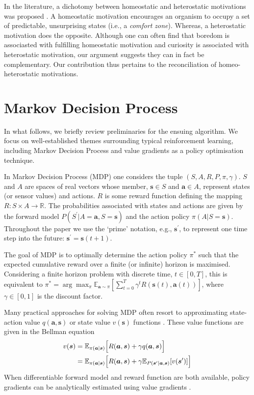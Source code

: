 \documentclass[utf8]{frontiersSCNS}
\newcommand{\bs}{\boldsymbol}
\newcommand{\argmax}{\arg\max}
\begin{document}
In the literature, a dichotomy between homeostatic and heterostatic motivations was proposed \citep{intrinsicmotiv}. A homeostatic motivation encourages an organism to occupy a set of predictable, unsurprising states (i.e., a {\it comfort zone}). Whereas, a heterostatic motivation does the opposite. Although one can often find that boredom is associasted with fulfilling homeostatic motivation and curiosity is associated with heterostatic motivation, our argument suggests they can in fact be complementary. Our contribution thus pertains to the reconciliation of homeo-heterostatic motivations.


\section{Markov Decision Process}

In what follows, we briefly review preliminaries for the ensuing algorithm. We focus on well-established themes surrounding typical reinforcement learning, including Markov Decision Process and value gradients as a policy optimisation technique. 

In Markov Decision Process (MDP) one considers the tuple $(S, A, R, P, \pi, \gamma)$. $S$ and $A$ are spaces of real vectors whose member, $\bs{s} \in S$ and $\bs{a} \in A$, represent states (or sensor values) and actions. $R$ is some reward function defining the mapping $R: S \times A \to \mathbb{R}$. The probabilities associated with states and actions are given by the forward model $P (S^\prime|A=\bs{a}, S=\bs{s})$ and the action policy $\pi(A|S=\bs{s})$. Throughout the paper we use the `prime' notation, e.g., $\bs{s}^\prime$, to represent one time step into the future: $\bs{s}^\prime=\bs{s}(t+1)$.

The goal of MDP is to optimally determine the action policy $\pi^\ast$ such that the expected cumulative reward over a finite (or infinite) horizon is maximised. Considering a finite horizon problem with discrete time, $t \in [0, T]$, this is equivalent to $\pi^\ast = \argmax_\pi \mathbb E_{\bs{a} \sim \pi}\left[ \sum_{t=0}^{T}\gamma^t R(\bs{s}(t), \bs{a}(t)) \right]$, where $\gamma \in [0, 1]$ is the discount factor.

Many practical approaches for solving MDP often resort to approximating state-action value $q(\bs{a}, \bs{s})$ or state value $v(\bs{s})$ functions \citep{sutton1998reinforcement, deepmind2013atari, deepmind2015lillicrap, svg}. These value functions are given in the Bellman equation
%
	\begin{equation}
	\begin{aligned} \label{eq:bellman}
	v(\bs{s}) 
	&=
	\mathbb{E}_{\pi(\bs{a}|\bs{s})} 
	\Bigl[ R(\bs{a}, \bs{s}) + \gamma q(\bs{a}, \bs{s}) \Bigr] \\
	&=
	\mathbb{E}_{\pi(\bs{a}|\bs{s})} 
	\Bigl[ R(\bs{a}, \bs{s}) + \gamma \mathbb{E}_{P(\bs{s}^\prime|\bs{a}, \bs{s})} [v(\bs{s}^\prime)] \Bigr]
	\end{aligned}
	\end{equation}
%
When differentiable forward model and reward function are both available, policy gradients can be analytically estimated using value gradients \citep{2012fairbank, svg}.
\end{document}

